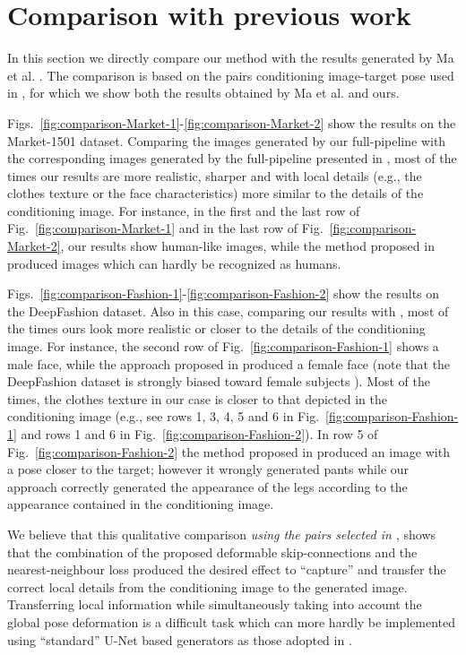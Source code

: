 \documentclass[10pt,twocolumn,letterpaper]{article}
\begin{document}
 
 
 
\section{Comparison with previous work}
\label{app.comparison}

In this section we directly compare our method with the results generated by Ma et al. \cite{ma2017pose}. The comparison is based on  the pairs conditioning image-target pose used in \cite{ma2017pose}, for which we show both the results obtained by Ma et al. \cite{ma2017pose} and ours.

Figs.~\ref{fig:comparison-Market-1}-\ref{fig:comparison-Market-2} show the results on the Market-1501 dataset. Comparing the images generated by our full-pipeline with the corresponding images generated by the full-pipeline presented in \cite{ma2017pose}, most of the times our results are more realistic, sharper and with local details (e.g., the clothes  texture or the face characteristics) more similar to the details of the conditioning image. 
For instance, in the first and the last row of Fig.~\ref{fig:comparison-Market-1} and in the last row of Fig.~\ref{fig:comparison-Market-2}, our results show  human-like images, while the method proposed in 
\cite{ma2017pose} produced images which can hardly be  recognized as humans.

Figs.~\ref{fig:comparison-Fashion-1}-\ref{fig:comparison-Fashion-2} show the results on the DeepFashion dataset. Also in this case, comparing our results with \cite{ma2017pose}, most of the times ours  look more realistic or closer to the details of the conditioning image.  For instance, the second row of Fig.~\ref{fig:comparison-Fashion-1} shows a male face, while the approach proposed in \cite{ma2017pose} produced a female face (note that the DeepFashion dataset is strongly biased toward female subjects \cite{ma2017pose}). Most of the times, the clothes texture in our case is closer to that depicted in the conditioning image (e.g., see rows 1, 3, 4, 5 and 6 in 
Fig.~\ref{fig:comparison-Fashion-1} 
and rows 1 and 6 in  Fig.~\ref{fig:comparison-Fashion-2}). In row 5 of Fig.~\ref{fig:comparison-Fashion-2} the method proposed in 
\cite{ma2017pose} produced an image with a pose closer to the target; however it wrongly generated pants while our approach correctly generated the  appearance of the legs according to the appearance contained in the conditioning image.


We believe that this qualitative comparison {\em using the pairs selected in \cite{ma2017pose}},
 shows that the combination of the proposed deformable skip-connections and the nearest-neighbour loss produced the desired effect to ``capture'' and transfer the correct local details from the conditioning image to the generated image.
 Transferring local information while simultaneously taking into account the global pose deformation is a difficult task which can more hardly be implemented using ``standard''
U-Net based generators as those adopted in \cite{ma2017pose}.
\end{document}
